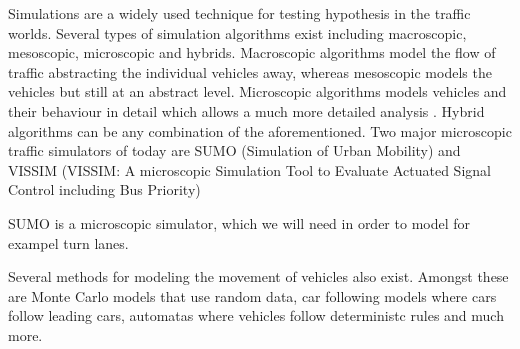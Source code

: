 Simulations are a widely used technique for testing hypothesis in the traffic worlds.
Several types of simulation algorithms exist including macroscopic, mesoscopic, microscopic and hybrids.
Macroscopic algorithms model the flow of traffic abstracting the individual vehicles away, whereas mesoscopic models the vehicles but still at an abstract level. 
Microscopic algorithms models vehicles and their behaviour in detail which allows a much more detailed analysis \cite{meso-micro}. 
Hybrid algorithms can be any combination of the aforementioned.
Two major microscopic traffic simulators of today are SUMO (Simulation of Urban Mobility)\cite{sumo} and VISSIM (VISSIM: A microscopic Simulation Tool to Evaluate Actuated Signal Control including Bus Priority)

SUMO is a microscopic simulator, which we will need in order to model for exampel turn lanes.


Several methods for modeling the movement of vehicles also exist.  %
Amongst these are Monte Carlo models \cite{} that use random data, car following models \cite{} where cars follow leading cars, automatas where vehicles follow deterministc rules \cite{} and much more.










